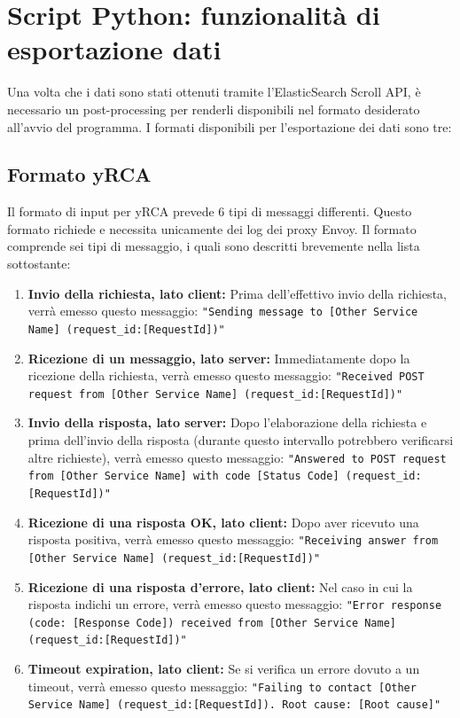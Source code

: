 \section{Script Python: funzionalità di esportazione dati}

Una volta che i dati sono stati ottenuti tramite l'ElasticSearch Scroll API, è necessario un post-processing per renderli disponibili nel formato desiderato all'avvio del programma.
I formati disponibili per l'esportazione dei dati sono tre:
\subsection{Formato yRCA}
Il formato di input per yRCA prevede 6 tipi di messaggi differenti. Questo formato richiede e necessita unicamente dei log dei proxy Envoy.
Il formato comprende sei tipi di messaggio, i quali sono descritti brevemente nella lista sottostante:
\begin{enumerate}
    \item \textbf{Invio della richiesta, lato client:} Prima dell'effettivo invio della richiesta, verrà emesso questo messaggio: \newline
    \texttt{"Sending message to [Other Service Name] (request\_id:[RequestId])"}

    \item \textbf{Ricezione di un messaggio, lato server:} Immediatamente dopo la ricezione della richiesta, verrà emesso questo messaggio: \newline
    \texttt{"Received POST request from [Other Service Name] (request\_id:[RequestId])"}

    \item \textbf{Invio della risposta, lato server:} Dopo l'elaborazione della richiesta e prima dell'invio della risposta (durante questo intervallo potrebbero verificarsi altre richieste), verrà emesso questo messaggio: \newline
    \texttt{"Answered to POST request from [Other Service Name] with code [Status Code] (request\_id:[RequestId])"}

    \item \textbf{Ricezione di una risposta OK, lato client:} Dopo aver ricevuto una risposta positiva, verrà emesso questo messaggio: \newline
    \texttt{"Receiving answer from [Other Service Name] (request\_id:[RequestId])"}

    \item \textbf{Ricezione di una risposta d'errore, lato client:} Nel caso in cui la risposta indichi un errore, verrà emesso questo messaggio: \newline
    \texttt{"Error response (code: [Response Code]) received from [Other Service Name] (request\_id:[RequestId])"}

    \item \textbf{Timeout expiration, lato client:} Se si verifica un errore dovuto a un timeout, verrà emesso questo messaggio: \newline
    \texttt{"Failing to contact [Other Service Name] (request\_id:[RequestId]). Root cause: [Root cause]"}
\end{enumerate}

